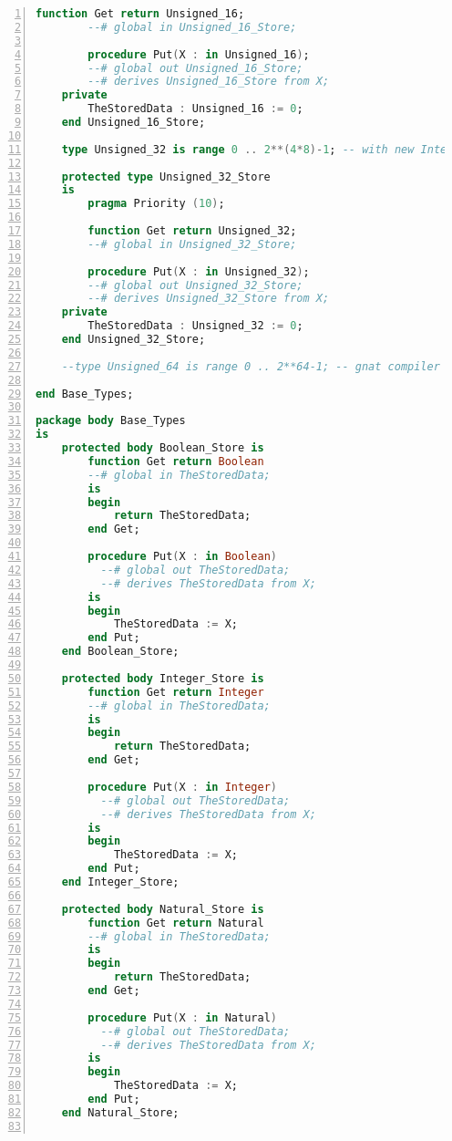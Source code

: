\begin{lstlisting}[language=ada, gobble=0, numbers=left, caption={\lstinline{Base_Types} package}, label={listing:pca_generated:base_types}]
        function Get return Unsigned_16;
        --# global in Unsigned_16_Store;

        procedure Put(X : in Unsigned_16);
        --# global out Unsigned_16_Store;
        --# derives Unsigned_16_Store from X;
    private
        TheStoredData : Unsigned_16 := 0;
    end Unsigned_16_Store;

    type Unsigned_32 is range 0 .. 2**(4*8)-1; -- with new Integer gnat compiler error: value not in range of type "Standard.Integer"

    protected type Unsigned_32_Store
    is
        pragma Priority (10);

        function Get return Unsigned_32;
        --# global in Unsigned_32_Store;

        procedure Put(X : in Unsigned_32);
        --# global out Unsigned_32_Store;
        --# derives Unsigned_32_Store from X;
    private
        TheStoredData : Unsigned_32 := 0;
    end Unsigned_32_Store;

    --type Unsigned_64 is range 0 .. 2**64-1; -- gnat compiler error: integer type definition bounds out of range

end Base_Types;

package body Base_Types
is
    protected body Boolean_Store is
        function Get return Boolean
        --# global in TheStoredData;
        is
        begin
            return TheStoredData;
        end Get;

        procedure Put(X : in Boolean)
          --# global out TheStoredData;
          --# derives TheStoredData from X;
        is
        begin
            TheStoredData := X;
        end Put;
    end Boolean_Store;

    protected body Integer_Store is
        function Get return Integer
        --# global in TheStoredData;
        is
        begin
            return TheStoredData;
        end Get;

        procedure Put(X : in Integer)
          --# global out TheStoredData;
          --# derives TheStoredData from X;
        is
        begin
            TheStoredData := X;
        end Put;
    end Integer_Store;

    protected body Natural_Store is
        function Get return Natural
        --# global in TheStoredData;
        is
        begin
            return TheStoredData;
        end Get;

        procedure Put(X : in Natural)
          --# global out TheStoredData;
          --# derives TheStoredData from X;
        is
        begin
            TheStoredData := X;
        end Put;
    end Natural_Store;


\end{lstlisting}

